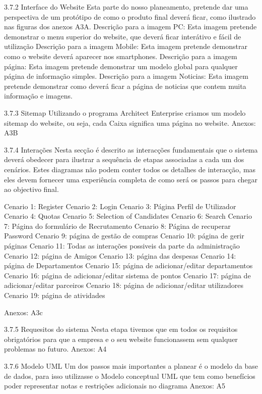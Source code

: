 \documentclass[11pt]{report}
\begin{document}
	3.7.2 Interface do Website
Esta parte do nosso planeamento, pretende dar uma perspectiva de um protótipo de como o produto final deverá ficar, como ilustrado nas figuras dos anexos A3A.
Descrição para a imagem PC: Esta imagem pretende demonstrar o menu superior do website, que deverá ficar interátivo e fácil de utilização
Descrição para a imagem Mobile: Esta imagem pretende demonstrar como o website deverá aparecer nos smartphones.
Descrição para a imagem página: Esta imagem pretende demonstrar um modelo global para qualquer página de informação simples.
Descrição para a imagem Noticias: Esta imagem pretende demonstrar como deverá ficar a página de noticias que contem muita informação e imagens.


	3.7.3 Sitemap
Utilizando o programa Architect Enterprise criamos um modelo sitemap do website, ou seja, cada Caixa significa uma página no website.
Anexos: A3B

	3.7.4 Interações
Nesta secção é descrito as interacções fundamentais que o sistema deverá obedecer para ilustrar a sequência de etapas associadas a cada um dos cenários.
Estes diagramas não podem conter todos os detalhes de interacção, mas eles devem fornecer uma experiência completa de como será os passos para chegar ao objectivo final.

		Cenario 1: Register
		Cenario 2: Login
		Cenario 3: Página Perfil de Utilizador
		Cenario 4: Quotas
		Cenario 5: Selection of Candidates
		Cenario 6: Search
		Cenario 7: Página do formulário de  Recrutamento
		Cenario 8: Página de recuperar Password
		Cenario 9: página de gestão de compras
		Cenario 10: página de gerir páginas
		Cenario 11: Todas as interações possiveis da parte da administração
		Cenario 12: página de Amigos 
		Cenario 13: página das despesas
		Cenario 14: página de Departamentos
		Cenario 15: página de adicionar/editar departamentos
		Cenario 16: página de adicionar/editar sistema de pontos
		Cenario 17: página de adicionar/editar parceiros
		Cenario 18: página de adicionar/editar utilizadores
		Cenario 19: página de atividades
		
		Anexos: A3c

	3.7.5 Requesitos do sistema
	Nesta etapa tivemos que em todos os requisitos obrigatórios para que a empresa e o seu website funcionassem sem qualquer problemas no futuro.
Anexos: A4

	3.7.6 Modelo UML
	Um dos passos mais importantes a planear é o modelo da base de dados, para isso utilizasse o Modelo conceptual UML que tem como benefícios poder representar notas e restrições adicionais no diagrama
Anexos: A5
\end{document}
